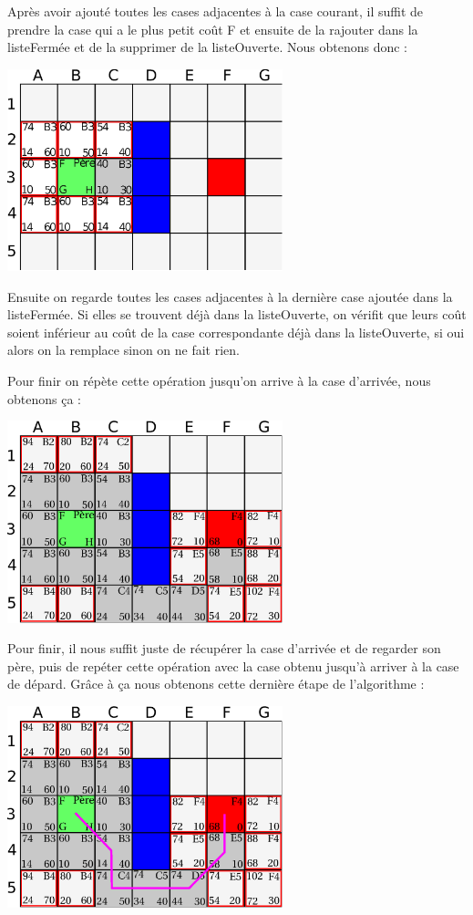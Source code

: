 			Après avoir ajouté toutes les cases adjacentes à la case courant, il suffit de prendre la case qui a le plus petit coût F et ensuite de la rajouter dans la listeFermée et de la supprimer de la listeOuverte. Nous obtenons donc :
			\begin{center}
				\includegraphics[width=8cm]{./Analyse/Img/Grille4.eps}
			\end{center}
		
			Ensuite on regarde toutes les cases adjacentes à la dernière case ajoutée dans la listeFermée. Si elles se trouvent déjà dans la listeOuverte, on vérifit que leurs coût soient inférieur au coût de la case correspondante déjà dans la listeOuverte, si oui alors on la remplace sinon on ne fait rien.
		
			Pour finir on répète cette opération jusqu'on arrive à la case d'arrivée, nous obtenons ça :
			\begin{center}
				\includegraphics[width=8cm]{./Analyse/Img/Grille5.eps}
			\end{center}
		
			Pour finir, il nous suffit juste de récupérer la case d'arrivée et de regarder son père, puis de repéter cette opération avec la case obtenu jusqu'à arriver à la case de dépard. Grâce à ça nous obtenons cette dernière étape de l'algorithme :
			\begin{center}
				\includegraphics[width=8cm]{./Analyse/Img/Grille6.eps}
			\end{center}
		
